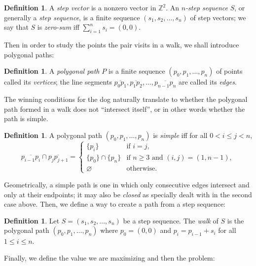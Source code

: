 \documentclass{amsart}
\theoremstyle{definition}
\newtheorem{definition}[proposition]{Definition}
\theoremstyle{problem}
\theoremstyle{remark}
\begin{document}
\begin{definition}
    A \emph{step vector} is a nonzero vector in $\mathbb{Z}^2$.
    An \emph{$n$-step sequence} $S$, or generally a \emph{step sequence},
    is a finite sequence $(s_1,s_2,\dots,s_n)$ of step vectors;
    we say that $S$ is \emph{zero-sum} iff $\sum_{i=1}^{n}s_i=(0,0)$.
\end{definition}

Then in order to study the points the pair visits in a walk, we shall introduce
polygonal paths:

\begin{definition}
    A \emph{polygonal path} $P$ is a finite sequence $(p_0,p_1,\dots,p_n)$
    of points called its \emph{vertices}; the line segments
    $\overline{p_0p_1},\overline{p_1p_2},\dots,\overline{p_{n-1}p_n}$
    are called its \emph{edges}.
\end{definition}

The winning conditions for the dog naturally translate to whether the polygonal
path formed in a walk does not ``intersect itself'', or in other words whether
the path is simple.

\begin{definition}
    A polygonal path $(p_0,p_1,\dots,p_n)$ is \emph{simple}
    iff for all $0<i\le j<n$,
    \[
        \overline{p_{i-1}p_i}\cap\overline{p_jp_{j+1}}=
        \begin{cases}
            \{p_i\}            & \text{if $i=j$},                     \\
            \{p_0\}\cap\{p_n\} & \text{if $n\ge3$ and $(i,j)=(1,n-1)$}, \\
            \varnothing        & \text{otherwise}.
        \end{cases}
    \]
\end{definition}

Geometrically, a simple path is one in which only consecutive
edges intersect and only at their endpoints; it may also
be \emph{closed} as specially dealt with in the second case above.
Then, we define a way to create a path from a step sequence:

\begin{definition}
    Let $S=(s_1,s_2,\dots,s_n)$ be a step sequence. The \emph{walk} of $S$
    is the polygonal path $(p_0,p_1,\dots,p_n)$
    where $p_0=(0,0)$ and $p_i=p_{i-1}+s_i$ for all $1\le i\le n$.
\end{definition}

Finally, we define the value we are maximizing and then the problem:
\end{document}
